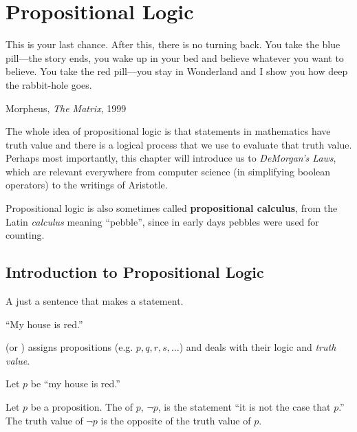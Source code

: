\chapter{Propositional Logic}
\epigraph{This is your last chance. After this, there is no turning back. You
take the blue pill---the story ends, you wake up in your bed and believe
whatever you want to believe. You take the red pill---you stay in Wonderland and
I show you how deep the rabbit-hole goes.}{Morpheus, \emph{The Matrix}, 1999}
\label{ch:propositional}

The whole idea of propositional logic is that statements in mathematics have truth value and there is a logical process that we use to evaluate that truth value.
Perhaps most importantly, this chapter will introduce us to \emph{DeMorgan's Laws}, which are relevant everywhere from computer science (in simplifying boolean operators) to the writings of Aristotle.

\begin{remark}
Propositional logic is also sometimes called \textbf{propositional calculus},
from the Latin \emph{calculus} meaning ``pebble'', since in early days pebbles
were used for counting.\cite{wiktionary-calculus}
\end{remark}

\section{Introduction to Propositional Logic}
\label{sec:propintro}

A  just a sentence that makes a statement.
\begin{ex}
  ``My house is red.''
\end{ex}

  (or )
  assigns propositions 
  (e.g. \(p, q, r, s, \ldots\))
  and deals with their logic and \emph{truth value}.
  \begin{ex}
    Let $p$ be ``my house is red.''
  \end{ex}

Let \(p\) be a proposition.
The  of \(p\),
$\neg p$,
is the statement
``it is not the case that \(p\).''
The truth value of \(\neg p\) is the opposite of the truth value of \(p\).

